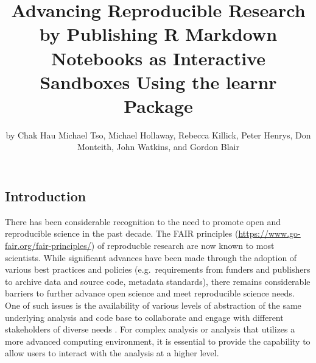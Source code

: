 \title{Advancing Reproducible Research by Publishing R Markdown
Notebooks as Interactive Sandboxes Using the learnr Package}
\author{by Chak Hau Michael Tso, Michael Hollaway, Rebecca
Killick, Peter Henrys, Don Monteith, John Watkins, and Gordon Blair}

\maketitle


\hypertarget{introduction}{%
\subsection{Introduction}\label{introduction}}

There has been considerable recognition to the need to promote open and
reproducible science in the past decade. The FAIR principles
\citep{Wilkinson2016a, Stall2019}
(\url{https://www.go-fair.org/fair-principles/}) of reproducble research
are now known to most scientists. While significant advances have been
made through the adoption of various best practices and policies
(e.g.~requirements from funders and publishers to archive data and
source code, metadata standards), there remains considerable barriers to
further advance open science and meet reproducible science needs. One of
such issues is the availability of various levels of abstraction of the
same underlying analysis and code base to collaborate and engage with
different stakeholders of diverse needs \citep{Blair2019, Hollaway2020}.
For complex analysis or analysis that utilizes a more advanced computing
environment, it is essential to provide the capability to allow users to
interact with the analysis at a higher level.

